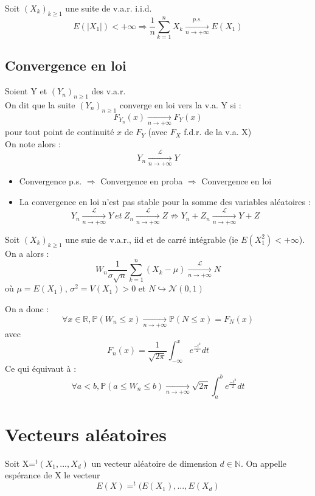 \begin{theo}
Soit $(X_k)_{k\geq 1}$ une suite de v.a.r. i.i.d.
\[E(|X_1|)<+\infty \Rightarrow \frac{1}{n}\sum_{k=1}^n X_k \xrightarrow[n\to +\infty]{p.s.} E(X_1)\]
\end{theo}

\subsection{Convergence en loi}
\begin{Def}
Soient Y et $(Y_n)_{n\geq 1}$ des v.a.r. \\
On dit que la suite $(Y_n)_{n\geq 1}$ converge en loi vers la v.a. Y si : \[F_{Y_n}(x)\xrightarrow[n\to +\infty]{}F_Y(x)\]
pour tout point de continuité $x$ de $F_Y$ (avec $F_X$ f.d.r. de la v.a. X) \\
On note alors : \[Y_n \xrightarrow[n\to +\infty]{\mathcal{L}}Y\]
\end{Def}

\begin{rmq}
\begin{itemize}
\item Convergence p.s. $\Rightarrow$ Convergence en proba $\Rightarrow$ Convergence en loi
\item La convergence en loi n'est pas stable pour la somme des variables aléatoires : 
\[Y_n \xrightarrow[n\to +\infty]{\mathcal{L}}Y\ et\ Z_n \xrightarrow[n\to +\infty]{\mathcal{L}}Z \not\Rightarrow Y_n +Z_n \xrightarrow[n\to +\infty]{\mathcal{L}}Y +Z\]
\end{itemize}
\end{rmq}

\begin{theo}
Soit $(X_k)_{k\geq 1}$ une suie de v.a.r., iid et de carré intégrable (ie $E(X_1^2)<+\infty$). On a alors :
\[W_n \frac{1}{\sigma \sqrt{n}} \sum_{k=1}^n (X_k-\mu) \xrightarrow[n\to +\infty]{\mathcal{L}} N\]
où $\mu = E(X_1)$, $\sigma^2=V(X_1)>0$ et $N \hookrightarrow \mathcal{N}(0,1)$
\end{theo}

On a donc : \[\forall x\in \mathbb{R}, \mathbb{P}(W_n\leq x) \xrightarrow[n\to +\infty]{} \mathbb{P}(N\leq x)=F_N(x)\]
avec \[F_n(x)=\frac{1}{\sqrt{2\pi}}\int_{-\infty}^x e^{\frac{-t^2}{2}} dt\]
Ce qui équivaut à : \[\forall a<b, \mathbb{P}(a\leq W_n \leq b) \xrightarrow[n\to +\infty]{} \sqrt{2\pi}\int_a^b e^{\frac{-t^2}{2}} dt\]

\section{Vecteurs aléatoires}
\begin{Def}
Soit X=$^t(X_1,...,X_d)$ un vecteur aléatoire de dimension $d\in\mathbb{N}$. On appelle espérance de X le vecteur \[E(X)=^t(E(X_1),...,E(X_d)\]
\end{Def}

